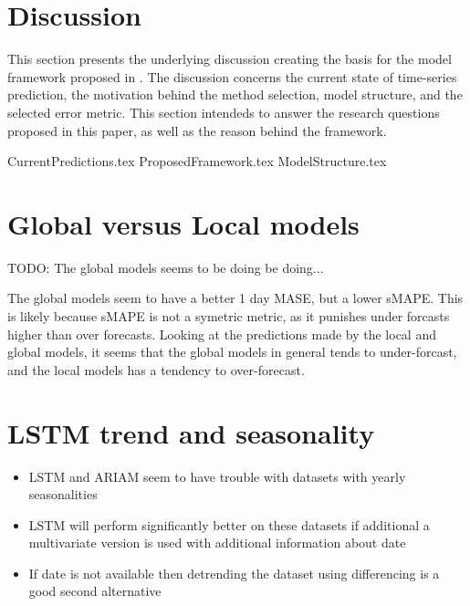 
\section{Discussion}
\label{section:Discussion:Discussion}


This section presents the underlying discussion creating the basis for the model framework proposed in .
The discussion concerns the current state of time-series prediction, the motivation behind the method selection, model structure, and the selected error metric.
This section intendeds to answer the research questions proposed in this paper,
as well as the reason behind the framework.


{CurrentPredictions.tex}
{ProposedFramework.tex}
{ModelStructure.tex}

\section{Global versus Local models}
TODO:
The global models seems to be doing be doing...

The global models seem to have a better 1 day MASE, but a lower sMAPE.
This is likely because sMAPE is not a symetric metric, as it punishes
under forcasts higher than over forecasts. Looking at the predictions made by
the local and global models, it seems that the global models in general tends to
under-forcast, and the local models has a tendency to over-forecast.

\section{LSTM trend and seasonality}
\begin{itemize}
  \item LSTM and ARIAM seem to have trouble with datasets with yearly seasonalities
  \item {LSTM will perform significantly better on these datasets if additional
        a multivariate version is used with additional information about date}
  \item {If date is not available then detrending the dataset using differencing is a good second alternative}
\end{itemize}


